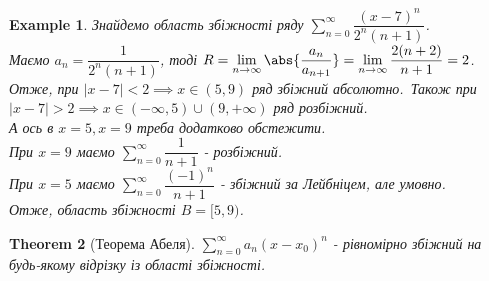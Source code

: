 \documentclass[a4paper, 10pt]{article}
\def\huge{\displaystyle}
\theoremstyle{theoremdd}
\newtheorem{theorem}{Theorem}[subsection]
\theoremstyle{theoremdd}
\theoremstyle{theoremdd}
\theoremstyle{theoremdd}
\theoremstyle{theoremdd}
\newtheorem{example}[theorem]{Example}
\theoremstyle{theoremdd}
\theoremstyle{theoremdd}
\theoremstyle{theoremdd}
\theoremstyle{theoremdd}
\begin{document}
\begin{example}
Знайдемо область збіжності ряду $\huge\sum_{n=0}^\infty \dfrac{(x-7)^n}{2^n (n+1)}$.\\
Маємо $a_n = \dfrac{1}{2^n (n+1)}$, тоді $R = \huge\lim_{n \to \infty} \abs{\dfrac{a_n}{a_{n+1}}} = \lim_{n \to \infty} \dfrac{2(n+2)}{n+1} = 2$.\\
Отже, при $|x-7| < 2 \implies x \in (5,9)$ ряд збіжний абсолютно.\
Також при $|x-7| > 2 \implies x \in (-\infty,5) \cup (9,+\infty)$ ряд розбіжний.\\
А ось в $x = 5, x = 9$ треба додатково обстежити.\\
При $x=9$ маємо $\huge\sum_{n=0}^\infty \dfrac{1}{n+1}$ - розбіжний.\\
При $x=5$ маємо $\huge\sum_{n=0}^\infty \dfrac{(-1)^n}{n+1}$ - збіжний за Лейбніцем, але умовно.\\
Отже, область збіжності $B = [5,9)$.
\end{example}

\begin{theorem}[Теорема Абеля]
$\huge \sum_{n=0}^\infty a_n(x-x_0)^n$ - рівномірно збіжний на будь-якому відрізку із області збіжності.
\end{theorem}
\end{document}
